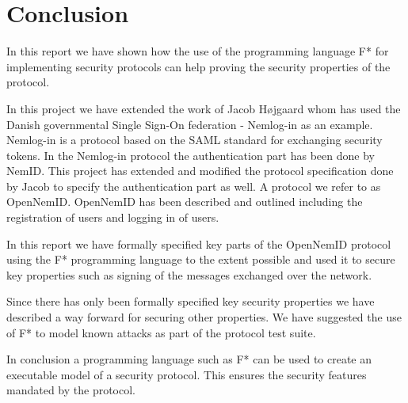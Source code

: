 \documentclass[twosided]{report}
\begin{document}
\section{Conclusion}
In this report we have shown how the use of the programming language F* for implementing security protocols can help proving the security properties of the protocol.
\par
In this project we have extended the work of Jacob H{\o}jgaard whom has used the Danish governmental Single Sign-On federation - Nemlog-in as an example. Nemlog-in is a protocol based on the SAML standard for exchanging security tokens. In the Nemlog-in protocol the authentication part has been done by NemID. This project has extended and modified the protocol specification done by Jacob to specify the authentication part as well. A protocol we refer to as OpenNemID. OpenNemID has been described and outlined including the registration of users and logging in of users.
\par
In this report we have formally specified key parts of the OpenNemID protocol using the F* programming language to the extent possible and used it to secure key properties such as signing of the messages exchanged over the network.
\par
Since there has only been formally specified key security properties we have described a way forward for securing other properties. We have suggested the use of F* to model known attacks as part of the protocol test suite.
\par
In conclusion a programming language such as F* can be used to create an executable model of a security protocol. This ensures the security features mandated by the protocol.
\end{document}
